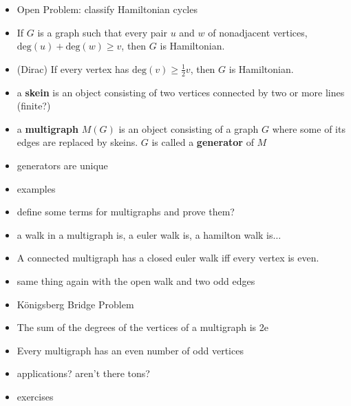 \begin{itemize}
    \item Open Problem: classify Hamiltonian cycles

    \item If $G$ is a graph such that every pair $u$ and $w$ of nonadjacent vertices, $\text{deg}(u) + \text{deg}(w) \geq v$, then $G$ is Hamiltonian.
    \item (Dirac) If every vertex has $\text{deg}(v) \geq \frac{1}{2}v$, then $G$ is Hamiltonian.


    \item a \textbf{skein} is an object consisting of two vertices connected by two or more lines (finite?)
    \item a \textbf{multigraph} $M(G)$ is an object consisting of a graph $G$ where some of its edges are replaced by skeins.  $G$ is called a \textbf{generator} of $M$
    \item generators are unique
    \item examples
    \item define some terms for multigraphs and prove them?
    \item a walk in a multigraph is, a euler walk is, a hamilton walk is$\ldots$
    \item A connected multigraph has a closed euler walk iff every vertex is even.
    \item same thing again with the open walk and two odd edges
    \item K\"{o}nigsberg Bridge Problem
    \item The sum of the degrees of the vertices of a multigraph is 2e
    \item Every multigraph has an even number of odd vertices
    \item applications?  aren't there tons?
    \item exercises
\end{itemize}
